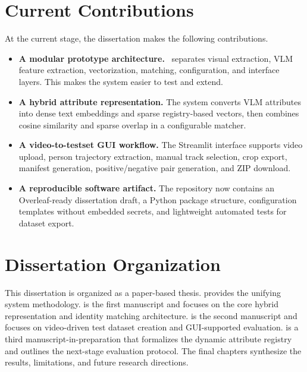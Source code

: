 \section{Current Contributions}

At the current stage, the dissertation makes the following contributions.

\begin{itemize}
  \item \textbf{A modular prototype architecture.} \systemname\ separates visual extraction, VLM feature extraction, vectorization, matching, configuration, and interface layers. This makes the system easier to test and extend.
  \item \textbf{A hybrid attribute representation.} The system converts VLM attributes into dense text embeddings and sparse registry-based vectors, then combines cosine similarity and sparse overlap in a configurable matcher.
  \item \textbf{A video-to-testset GUI workflow.} The Streamlit interface supports video upload, person trajectory extraction, manual track selection, crop export, manifest generation, positive/negative pair generation, and ZIP download.
  \item \textbf{A reproducible software artifact.} The repository now contains an Overleaf-ready dissertation draft, a Python package structure, configuration templates without embedded secrets, and lightweight automated tests for dataset export.
\end{itemize}

\section{Dissertation Organization}

This dissertation is organized as a paper-based thesis.  provides the unifying system methodology.  is the first manuscript and focuses on the core hybrid representation and identity matching architecture.  is the second manuscript and focuses on video-driven test dataset creation and GUI-supported evaluation.  is a third manuscript-in-preparation that formalizes the dynamic attribute registry and outlines the next-stage evaluation protocol. The final chapters synthesize the results, limitations, and future research directions.
